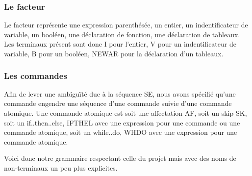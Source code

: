\documentclass[11pt,a4paper]{article}
\begin{document}
\subsubsection{Le facteur}
Le facteur représente une expression parenthésée, un entier, un indentificateur de variable, un booléen, une déclaration de fonction, une déclaration de tableaux. Les terminaux présent sont donc I pour l'entier, V pour un indentificateur de variable, B pour un booléen, NEWAR pour la déclaration d'un tableaux.
\subsubsection{Les commandes}
Afin de lever une ambiguïté due à la séquence SE, nous avons spécifié qu'une commande engendre une séquence d'une commande suivie d'une commande atomique. 
Une commande atomique est soit une affectation AF, soit un skip SK, soit un if..then..else, IFTHEL avec une expression pour une commande ou une commande atomique, soit un while..do, WHDO avec une expression pour une commande atomique.


Voici donc notre grammaire respectant celle du projet mais avec des noms de non-terminaux un peu plus explicites.
\end{document}
